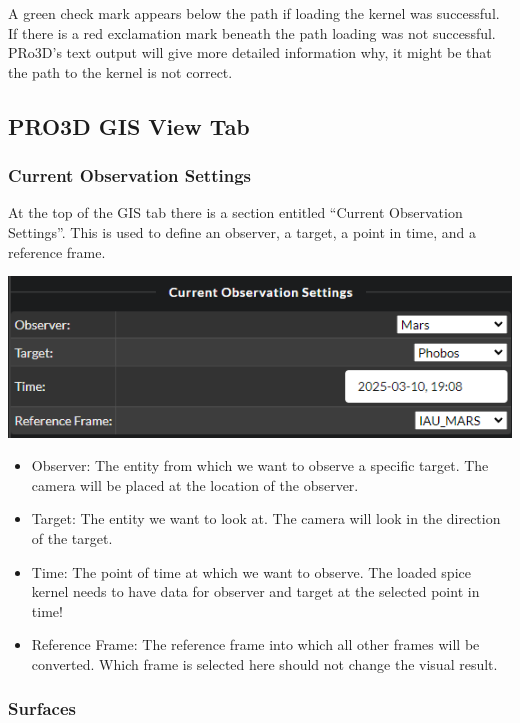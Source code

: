 A green check mark appears below the path if loading the kernel was
successful. If there is a red exclamation mark beneath the path loading
was not successful. PRo3D's text output will give more detailed
information why, it might be that the path to the kernel is not correct.

\hypertarget{pro3d-gis-view-tab}{%
\subsection{PRO3D GIS View Tab}\label{pro3d-gis-view-tab}}

\hypertarget{current-observation-settings}{%
\subsubsection{Current Observation
Settings}\label{current-observation-settings}}

At the top of the GIS tab there is a section entitled ``Current
Observation Settings''. This is used to define an observer, a target, a
point in time, and a reference frame.

\includegraphics{images/currentObservationSettings.png}

\begin{itemize}
\tightlist
\item
  Observer: The entity from which we want to observe a specific target.
  The camera will be placed at the location of the observer.
\item
  Target: The entity we want to look at. The camera will look in the
  direction of the target.
\item
  Time: The point of time at which we want to observe. The loaded spice
  kernel needs to have data for observer and target at the selected
  point in time!
\item
  Reference Frame: The reference frame into which all other frames will
  be converted. Which frame is selected here should not change the
  visual result.
\end{itemize}

\hypertarget{surfaces}{%
\subsubsection{Surfaces}\label{surfaces}}

